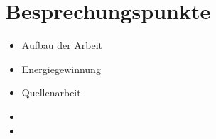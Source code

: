 \documentclass[12pt]{article}
\begin{document}
\medskip

\section{\textbf{Besprechungspunkte}}
\begin{itemize}
  \item Aufbau der Arbeit
  \item Energiegewinnung
  \item Quellenarbeit
  \item
  \item
\end{itemize}

\bigskip

\printbibliography[title=Referenzen]
\end{document}

